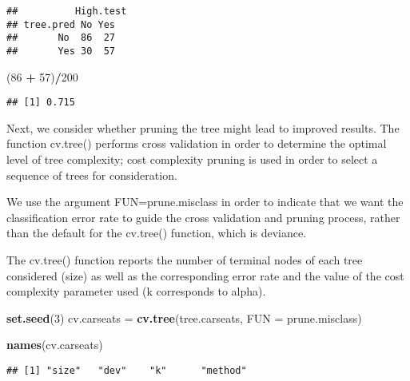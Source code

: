 \documentclass[]{article}
\newenvironment{Shaded}{\begin{snugshade}}{\end{snugshade}}
\newcommand{\KeywordTok}[1]{\textcolor[rgb]{0.13,0.29,0.53}{\textbf{#1}}}
\newcommand{\DataTypeTok}[1]{\textcolor[rgb]{0.13,0.29,0.53}{#1}}
\newcommand{\DecValTok}[1]{\textcolor[rgb]{0.00,0.00,0.81}{#1}}
\newcommand{\StringTok}[1]{\textcolor[rgb]{0.31,0.60,0.02}{#1}}
\newcommand{\OperatorTok}[1]{\textcolor[rgb]{0.81,0.36,0.00}{\textbf{#1}}}
\newcommand{\NormalTok}[1]{#1}
\begin{document}
\begin{verbatim}
##          High.test
## tree.pred No Yes
##       No  86  27
##       Yes 30  57
\end{verbatim}

\begin{Shaded}
\begin{Highlighting}[]
\NormalTok{(}\DecValTok{86} \OperatorTok{+}\StringTok{ }\DecValTok{57}\NormalTok{)}\OperatorTok{/}\DecValTok{200} 
\end{Highlighting}
\end{Shaded}

\begin{verbatim}
## [1] 0.715
\end{verbatim}

Next, we consider whether pruning the tree might lead to improved
results. The function cv.tree() performs cross validation in order to
determine the optimal level of tree complexity; cost complexity pruning
is used in order to select a sequence of trees for consideration.

We use the argument FUN=prune.misclass in order to indicate that we want
the classification error rate to guide the cross validation and pruning
process, rather than the default for the cv.tree() function, which is
deviance.

The cv.tree() function reports the number of terminal nodes of each tree
considered (size) as well as the corresponding error rate and the value
of the cost complexity parameter used (k corresponds to alpha).

\begin{Shaded}
\begin{Highlighting}[]
\KeywordTok{set.seed}\NormalTok{(}\DecValTok{3}\NormalTok{)}
\NormalTok{cv.carseats =}\StringTok{ }\KeywordTok{cv.tree}\NormalTok{(tree.carseats, }\DataTypeTok{FUN =}\NormalTok{ prune.misclass)}

\KeywordTok{names}\NormalTok{(cv.carseats)}
\end{Highlighting}
\end{Shaded}

\begin{verbatim}
## [1] "size"   "dev"    "k"      "method"
\end{verbatim}

\begin{Shaded}
\end{Shaded}
\end{document}

